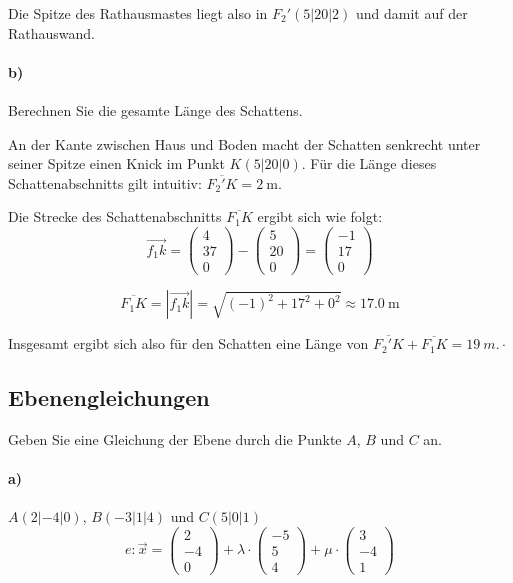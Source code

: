 \documentclass{ajc}
\numberwithin{equation}{subsection}
\begin{document}
	Die Spitze des Rathausmastes liegt also in $F_2'(5|20|2)$ und damit auf der Rathauswand.
	
	\paragraph{b)} Berechnen Sie die gesamte Länge des Schattens.
	
	An der Kante zwischen Haus und Boden macht der Schatten senkrecht unter seiner Spitze einen Knick im Punkt $K(5|20|0)$. Für die Länge dieses Schattenabschnitts gilt intuitiv: $\overline{F_2'K} = \SI{2}{\m}$.
	
	Die Strecke des Schattenabschnitts $\overline{F_1K}$ ergibt sich wie folgt:
	\begin{equation}
		\overrightarrow{f_1k} = \left(\begin{array}{r} 4 \\ 37 \\ 0\end{array}\right) - \left(\begin{array}{r} 5 \\ 20 \\ 0\end{array}\right) = \left(\begin{array}{r} -1 \\ 17 \\ 0\end{array}\right)
	\end{equation}
	
	\begin{equation}
		\overline{F_1K} = \left|\overrightarrow{f_1k}\right| = \sqrt{(-1)^2 + 17^2 + 0^2} \approx \SI{17,0}{\m}
	\end{equation}
	
	Insgesamt ergibt sich also für den Schatten eine Länge von $\overline{F_2'K} + \overline{F_1K} = \SI{19}{m}.·$
	
	\subsection{Ebenengleichungen}
	Geben Sie eine Gleichung der Ebene durch die Punkte $A$, $B$ und $C$ an.
	
	\paragraph{a)}$A(2|-4|0)$, $B(-3|1|4)$ und $C(5|0|1)$
	\begin{equation}
		e: \vec{x} = \left(\begin{array}{r} 2 \\ -4 \\ 0\end{array}\right) + \lambda \cdot \left(\begin{array}{r} -5 \\ 5 \\ 4\end{array}\right) + \mu \cdot \left(\begin{array}{r} 3 \\ -4 \\ 1\end{array}\right)
	\end{equation}
	
\end{document}
